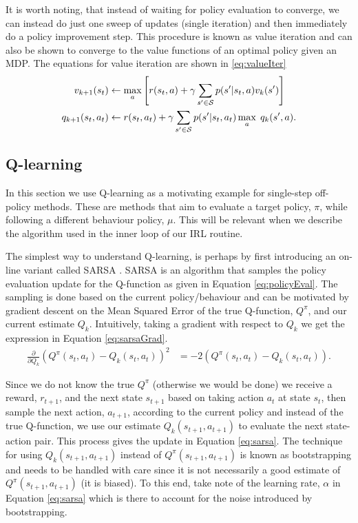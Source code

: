 \documentclass{report}
\numberwithin{equation}{section}
\numberwithin{figure}{section}
\numberwithin{table}{section}
\numberwithin{algorithm}{section}
\begin{document}
It is worth noting, that instead of waiting for policy evaluation 
to converge, we can instead do just one sweep 
of updates (single iteration) and then immediately do a policy 
improvement step. This procedure is known as value iteration and 
can also be shown to converge to the value functions of an 
optimal policy given an MDP. The equations for value iteration 
are shown in \ref{eq:valueIter}
\begin{align}\label{eq:valueIter}
  v_{k+1}(s_t)&\gets\max_a \left[r(s_t, a) 
  + \gamma \sum_{s'\in\mathcal{S}}p(s'|s_t, a)v_{k}(s')\right]\notag\\
  q_{k+1}(s_t, a_t)&\gets r(s_t, a_t) 
  + \gamma \sum_{s'\in\mathcal{S}}p(s'|s_t, a_t)\max_a\; q_{k}(s', a).
\end{align}


\subsection{Q-learning}\label{sec:Qlearning}
In this section we use Q-learning \citep{QlearningWatkins1992} 
as a motivating example 
for single-step off-policy methods. These are methods 
that aim to evaluate a target policy, $\pi$, while following 
a different behaviour policy, $\mu$. This will be relevant when 
we describe the algorithm \citep{SAC2} 
used in the inner loop of our IRL routine.

The simplest way to understand Q-learning, is perhaps by 
first introducing an on-line variant called SARSA \citep{SARSA}. 
SARSA is an algorithm that samples the policy evaluation update 
for the Q-function as given in Equation \ref{eq:policyEval}.
The sampling is done based on the current policy/behaviour and can 
be motivated by gradient descent on the Mean Squared Error of 
the true Q-function, $Q^{\pi}$, and our current estimate $Q_{k}$.
Intuitively, taking a gradient with respect to $Q_{k}$ we get the 
expression in Equation \ref{eq:sarsaGrad}.
\begin{align}\label{eq:sarsaGrad}
  \frac{\partial}{\partial Q_{k}}(Q^{\pi}(s_t, a_t) - Q_{k}(s_t, a_t))^2&=-2(Q^{\pi}(s_t, a_t) - Q_{k}(s_t,a_t)).
\end{align}

Since we do not know the true $Q^{\pi}$ (otherwise we would be done) 
we receive a reward, $r_{t+1}$, and the next state $s_{t+1}$ 
based on taking action $a_t$ at state $s_t$, then sample the next 
action, $a_{t+1}$, according to the current policy and instead of the 
true Q-function, we use our estimate $Q_{k}(s_{t+1}, a_{t+1})$ to evaluate 
the next state-action pair. This process gives the update in 
Equation \ref{eq:sarsa}.
The technique for using $Q_{k}(s_{t+1}, a_{t+1})$ instead 
of $Q^{\pi}(s_{t+1}, a_{t+1})$ is known as bootstrapping and needs to be 
handled with care since it is not 
necessarily a good estimate of $Q^{\pi}(s_{t+1}, a_{t+1})$ (it is biased). 
To this end, take note of the learning rate, $\alpha$ in Equation 
\ref{eq:sarsa} which is there to account for the noise introduced 
by bootstrapping.
\end{document}
